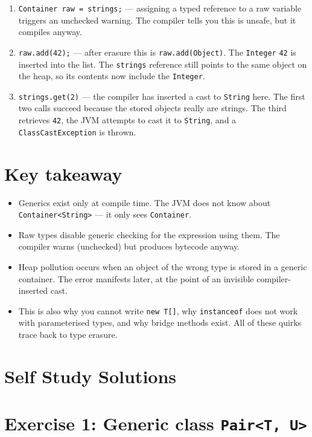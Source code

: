\documentclass[twoside=false,DIV=14]{scrartcl}
\begin{document}
\begin{enumerate}
    \item \texttt{Container raw = strings;} --- assigning a typed reference to a raw variable triggers an unchecked warning.  The compiler tells you this is unsafe, but it compiles anyway.
    \item \texttt{raw.add(42);} --- after erasure this is \texttt{raw.add(Object)}.  The \texttt{Integer} \texttt{42} is inserted into the list.  The \texttt{strings} reference still points to the same object on the heap, so its contents now include the \texttt{Integer}.
    \item \texttt{strings.get(2)} --- the compiler has inserted a cast to \texttt{String} here.  The first two calls succeed because the stored objects really are strings.  The third retrieves \texttt{42}, the JVM attempts to cast it to \texttt{String}, and a \texttt{ClassCastException} is thrown.
\end{enumerate}

\section*{Key takeaway}

\begin{itemize}
    \item Generics exist only at compile time.  The JVM does not know about \texttt{Container<String>} --- it only sees \texttt{Container}.
    \item Raw types disable generic checking for the expression using them.  The compiler warns (unchecked) but produces bytecode anyway.
    \item Heap pollution occurs when an object of the wrong type is stored in a generic container.  The error manifests later, at the point of an invisible compiler-inserted cast.
    \item This is also why you cannot write \texttt{new T[]}, why \texttt{instanceof} does not work with parameterised types, and why bridge methods exist.  All of these quirks trace back to type erasure.
\end{itemize}

\section*{Self Study Solutions}

\section*{Exercise 1: Generic class \texttt{Pair<T, U>}}
\end{document}
